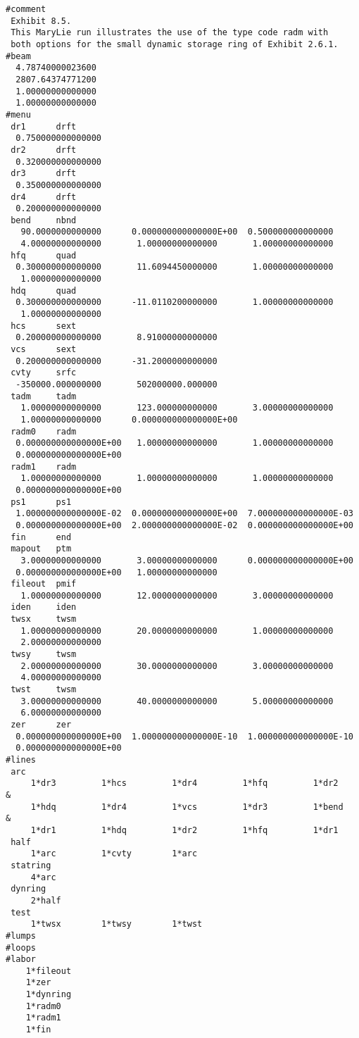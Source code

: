 \vspace{5mm}
\begin{footnotesize}
\begin{verbatim}
#comment
 Exhibit 8.5.
 This MaryLie run illustrates the use of the type code radm with
 both options for the small dynamic storage ring of Exhibit 2.6.1.
#beam
  4.78740000023600
  2807.64374771200
  1.00000000000000
  1.00000000000000
#menu
 dr1      drft
  0.750000000000000
 dr2      drft
  0.320000000000000
 dr3      drft
  0.350000000000000
 dr4      drft
  0.200000000000000
 bend     nbnd
   90.0000000000000      0.000000000000000E+00  0.500000000000000
   4.00000000000000       1.00000000000000       1.00000000000000
 hfq      quad
  0.300000000000000       11.6094450000000       1.00000000000000
   1.00000000000000
 hdq      quad
  0.300000000000000      -11.0110200000000       1.00000000000000
   1.00000000000000
 hcs      sext
  0.200000000000000       8.91000000000000
 vcs      sext
  0.200000000000000      -31.2000000000000
 cvty     srfc
  -350000.000000000       502000000.000000
 tadm     tadm
   1.00000000000000       123.000000000000       3.00000000000000
   1.00000000000000      0.000000000000000E+00
 radm0    radm
  0.000000000000000E+00   1.00000000000000       1.00000000000000
  0.000000000000000E+00
 radm1    radm
   1.00000000000000       1.00000000000000       1.00000000000000
  0.000000000000000E+00
 ps1      ps1
  1.000000000000000E-02  0.000000000000000E+00  7.000000000000000E-03
  0.000000000000000E+00  2.000000000000000E-02  0.000000000000000E+00
 fin      end
 mapout   ptm
   3.00000000000000       3.00000000000000      0.000000000000000E+00
  0.000000000000000E+00   1.00000000000000
 fileout  pmif
   1.00000000000000       12.0000000000000       3.00000000000000
 iden     iden
 twsx     twsm
   1.00000000000000       20.0000000000000       1.00000000000000
   2.00000000000000
 twsy     twsm
   2.00000000000000       30.0000000000000       3.00000000000000
   4.00000000000000
 twst     twsm
   3.00000000000000       40.0000000000000       5.00000000000000
   6.00000000000000
 zer      zer
  0.000000000000000E+00  1.000000000000000E-10  1.000000000000000E-10
  0.000000000000000E+00
#lines
 arc
     1*dr3         1*hcs         1*dr4         1*hfq         1*dr2      &
     1*hdq         1*dr4         1*vcs         1*dr3         1*bend     &
     1*dr1         1*hdq         1*dr2         1*hfq         1*dr1
 half
     1*arc         1*cvty        1*arc
 statring
     4*arc
 dynring
     2*half
 test
     1*twsx        1*twsy        1*twst
#lumps
#loops
#labor
    1*fileout
    1*zer
    1*dynring
    1*radm0
    1*radm1
    1*fin


\end{verbatim}
\end{footnotesize}
